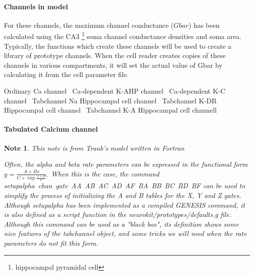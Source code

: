 \documentclass[]{article}%
\newtheorem{note}{Note}
\begin{document}
\paragraph{Channels in model}
 
 For these channels, the maximum channel conductance ($Gbar$) has been
 calculated using the {\Tt{}CA3\nwendquote} \footnote{hippocampal pyramidal cell} soma channel
 conductance densities and soma area.  Typically, the functions which create
 these channels will be used to create a library of prototype channels.  When
 the cell reader creates copies of these channels in various compartments, it
 will set the actual value of Gbar by calculating it from the cell parameter
 file.


\nwenddocs{}\endmoddef\nwstartdeflinemarkup{}\nwenddeflinemarkup
\LA{}Ordinary Ca channel~{\nwtagstyle{}}\RA{}
\LA{}Ca-dependent K-AHP channel~{\nwtagstyle{}}\RA{}
\LA{}Ca-dependent K-C channel~{\nwtagstyle{}}\RA{}
\LA{}Tabchannel Na Hippocampal cell channel~{\nwtagstyle{}}\RA{}
\LA{}Tabchannel K-DR Hippocampal cell channel~{\nwtagstyle{}}\RA{}
\LA{}Tabchannel K-A Hippocampal cell channell~{\nwtagstyle{}}\RA{}

\eatline
{}\nwendcode{}\nwdocspar
\paragraph{Tabulated Calcium channel}
    

\begin{note}{This note is from Traub's model written in Fortran}

Often, the alpha and beta rate parameters can be expressed in the functional
form $y = \frac{A + Bx}{C + \exp{\frac{x + D}{F}}}$.  When this is the case, the
command {\Tt{}setupalpha\ chan\ gate\ AA\ AB\ AC\ AD\ AF\ BA\ BB\ BC\ BD\ BF\nwendquote} can be used to
simplify the process of initializing the A and B tables for the X, Y and Z
gates.  Although {\Tt{}setupalpha\nwendquote} has been implemented as a compiled GENESIS
command, it is also defined as a script function in the
{\Tt{}neurokit/prototypes/defaults.g\nwendquote} file.  Although this command can be used as a
"black box", its definition shows some nice features of the {\Tt{}tabchannel\nwendquote}
object, and some tricks we will need when the rate parameters do not fit this
form.

\end{note}
\end{document}
